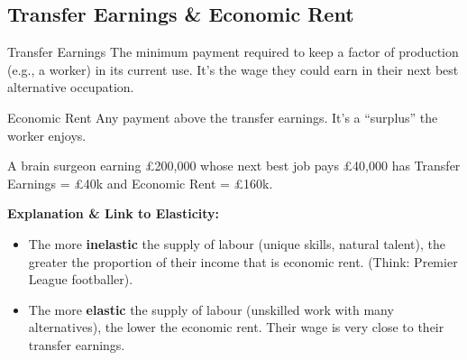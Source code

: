 \documentclass[11pt, a4paper, twoside]{book}
\begin{document}
\subsection{Transfer Earnings \& Economic Rent}

\begin{keyterm}{Transfer Earnings}
The minimum payment required to keep a factor of production (e.g., a worker) in its current use. It's the wage they could earn in their next best alternative occupation.
\end{keyterm}

\begin{keyterm}{Economic Rent}
Any payment above the transfer earnings. It's a ``surplus'' the worker enjoys.
\end{keyterm}

\begin{example}
A brain surgeon earning £200,000 whose next best job pays £40,000 has Transfer Earnings = £40k and Economic Rent = £160k.
\end{example}

\textbf{Explanation \& Link to Elasticity:}
\begin{itemize}
  \item The more \textbf{inelastic} the supply of labour (unique skills, natural talent), the greater the proportion of their income that is economic rent. (Think: Premier League footballer).
  \item The more \textbf{elastic} the supply of labour (unskilled work with many alternatives), the lower the economic rent. Their wage is very close to their transfer earnings.
\end{itemize}
\end{document}
